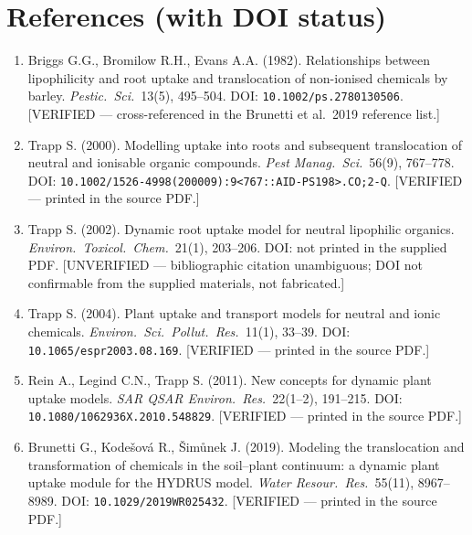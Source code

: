 \documentclass[11pt]{article}
\begin{document}
\section*{References (with DOI status)}
\small
\begin{enumerate}[leftmargin=1.6em,itemsep=2pt]
\item Briggs G.G., Bromilow R.H., Evans A.A. (1982). Relationships between lipophilicity and root
uptake and translocation of non-ionised chemicals by barley. \textit{Pestic.\ Sci.}\ 13(5),
495--504. DOI: \texttt{10.1002/ps.2780130506}. \textcolor{cNcol}{[VERIFIED --- cross-referenced in
the Brunetti et al.\ 2019 reference list.]}
\item Trapp S. (2000). Modelling uptake into roots and subsequent translocation of neutral and
ionisable organic compounds. \textit{Pest Manag.\ Sci.}\ 56(9), 767--778. DOI:
\texttt{10.1002/1526-4998(200009)\-:9<767::\-\allowbreak AID-PS198>\-.CO;2-Q}. \textcolor{cNcol}{[VERIFIED ---
printed in the source PDF.]}
\item Trapp S. (2002). Dynamic root uptake model for neutral lipophilic organics. \textit{Environ.\
Toxicol.\ Chem.}\ 21(1), 203--206. DOI: not printed in the supplied PDF. \textcolor{cPcol}{[UNVERIFIED
--- bibliographic citation unambiguous; DOI not confirmable from the supplied materials, not
fabricated.]}
\item Trapp S. (2004). Plant uptake and transport models for neutral and ionic chemicals.
\textit{Environ.\ Sci.\ Pollut.\ Res.}\ 11(1), 33--39. DOI: \texttt{10.1065/espr2003.08.169}.
\textcolor{cNcol}{[VERIFIED --- printed in the source PDF.]}
\item Rein A., Legind C.N., Trapp S. (2011). New concepts for dynamic plant uptake models.
\textit{SAR QSAR Environ.\ Res.}\ 22(1--2), 191--215. DOI: \texttt{10.1080/1062936X.2010.548829}.
\textcolor{cNcol}{[VERIFIED --- printed in the source PDF.]}
\item Brunetti G., Kode\v{s}ov\'a R., \v{S}im\r{u}nek J. (2019). Modeling the translocation and
transformation of chemicals in the soil--plant continuum: a dynamic plant uptake module for the
HYDRUS model. \textit{Water Resour.\ Res.}\ 55(11), 8967--8989. DOI: \texttt{10.1029/2019WR025432}.
\textcolor{cNcol}{[VERIFIED --- printed in the source PDF.]}
\end{enumerate}
\end{document}
